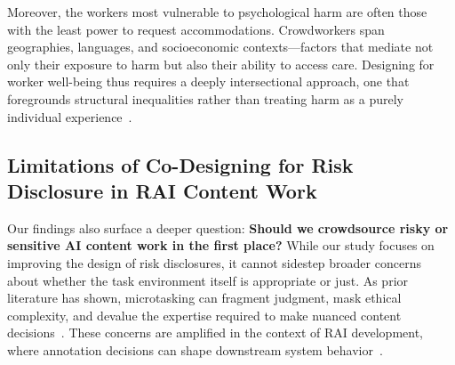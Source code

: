 Moreover, the workers most vulnerable to psychological harm are often those with the least power to request accommodations. Crowdworkers span geographies, languages, and socioeconomic contexts—factors that mediate not only their exposure to harm but also their ability to access care. Designing for worker well-being thus requires a deeply intersectional approach, one that foregrounds structural inequalities rather than treating harm as a purely individual experience~\cite{miceli2022data}.

\subsection{Limitations of Co-Designing for Risk Disclosure in RAI Content Work}

Our findings also surface a deeper question: \textbf{Should we crowdsource risky or sensitive AI content work in the first place?} While our study focuses on improving the design of risk disclosures, it cannot sidestep broader concerns about whether the task environment itself is appropriate or just. As prior literature has shown, microtasking can fragment judgment, mask ethical complexity, and devalue the expertise required to make nuanced content decisions~\cite{berg2018digital}. These concerns are amplified in the context of RAI development, where annotation decisions can shape downstream system behavior~\cite{wang2022whose, diaz2022crowdworksheets}.

